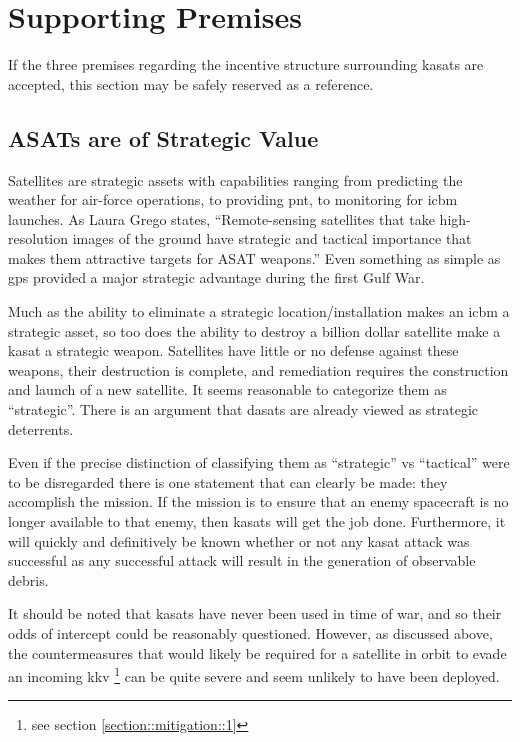 \section{Supporting Premises}
\label{section::support}

If the three premises regarding the incentive structure surrounding
\acp{kasat} are accepted, this section may be safely reserved as a
reference.

\subsection{ASATs are of Strategic Value}

Satellites are strategic assets with capabilities ranging from
predicting the weather for air-force operations, to providing
\ac{pnt}, to monitoring for \ac{icbm} launches.  As Laura Grego
states, ``Remote-sensing satellites that take high-resolution images
of the ground have strategic and tactical importance that makes them
attractive targets for ASAT weapons.''\cite[p16]{grego} Even something
as simple as \ac{gps} provided a major strategic advantage during the
first Gulf War.\cite{gps-gulf}

Much as the ability to eliminate a strategic location/installation
makes an \ac{icbm} a strategic asset, so too does the ability to
destroy a billion dollar satellite make a \ac{kasat} a strategic
weapon.  Satellites have little or no defense against these weapons,
their destruction is complete, and remediation requires the
construction and launch of a new satellite.  It seems reasonable to
categorize them as ``strategic''.  There is an argument that
\acp{dasat} are already viewed as strategic
deterrents.\cite{war-no-more}

Even if the precise distinction of classifying them as ``strategic''
vs ``tactical'' were to be disregarded there is one statement that can
clearly be made: they accomplish the mission.  If the mission is to
ensure that an enemy spacecraft is no longer available to that enemy,
then \acp{kasat} will get the job done.  Furthermore, it will quickly
and definitively be known whether or not any \ac{kasat} attack was
successful as any successful attack will result in the generation of
observable debris.

It should be noted that \acp{kasat} have never been used in time of
war\cite{brian}, and so their odds of intercept could be reasonably
questioned.  However, as discussed above, the countermeasures that
would likely be required for a satellite in orbit to evade an incoming
\ac{kkv} \footnote{see section \ref{section::mitigation::1}} can be
quite severe and seem unlikely to have been deployed.

